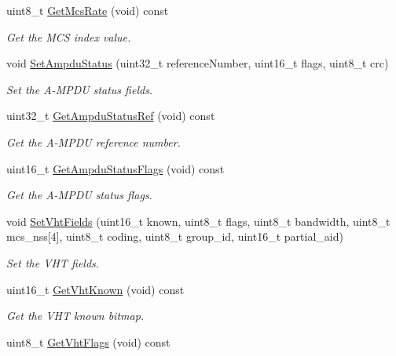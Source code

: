 \begin{DoxyCompactItemize}
uint8\+\_\+t \hyperlink{classns3_1_1RadiotapHeader_a76acbe2a92c1f1c29f6e6d86513d0b48}{Get\+Mcs\+Rate} (void) const 
\begin{DoxyCompactList}\small\item\em Get the M\+CS index value. \end{DoxyCompactList}\item 
void \hyperlink{classns3_1_1RadiotapHeader_a8fae7a24dbeba412fdb9b7fc79f74f41}{Set\+Ampdu\+Status} (uint32\+\_\+t reference\+Number, uint16\+\_\+t flags, uint8\+\_\+t crc)
\begin{DoxyCompactList}\small\item\em Set the A-\/\+M\+P\+DU status fields. \end{DoxyCompactList}\item 
uint32\+\_\+t \hyperlink{classns3_1_1RadiotapHeader_ad76416e8181f1df33505bef97e6bc9b5}{Get\+Ampdu\+Status\+Ref} (void) const 
\begin{DoxyCompactList}\small\item\em Get the A-\/\+M\+P\+DU reference number. \end{DoxyCompactList}\item 
uint16\+\_\+t \hyperlink{classns3_1_1RadiotapHeader_a250c74973add353a1d80c7167dbbbd75}{Get\+Ampdu\+Status\+Flags} (void) const 
\begin{DoxyCompactList}\small\item\em Get the A-\/\+M\+P\+DU status flags. \end{DoxyCompactList}\item 
void \hyperlink{classns3_1_1RadiotapHeader_a548ef08ad90c0b7c2e20a149d4e8942c}{Set\+Vht\+Fields} (uint16\+\_\+t known, uint8\+\_\+t flags, uint8\+\_\+t bandwidth, uint8\+\_\+t mcs\+\_\+nss\mbox{[}4\mbox{]}, uint8\+\_\+t coding, uint8\+\_\+t group\+\_\+id, uint16\+\_\+t partial\+\_\+aid)
\begin{DoxyCompactList}\small\item\em Set the V\+HT fields. \end{DoxyCompactList}\item 
uint16\+\_\+t \hyperlink{classns3_1_1RadiotapHeader_aad9b2ba6f3a4e27743e7a6e1b412a18c}{Get\+Vht\+Known} (void) const 
\begin{DoxyCompactList}\small\item\em Get the V\+HT known bitmap. \end{DoxyCompactList}\item 
uint8\+\_\+t \hyperlink{classns3_1_1RadiotapHeader_a13bec5051cccd94b6a1f07cc6d2c0c9e}{Get\+Vht\+Flags} (void) const 

\end{DoxyCompactItemize}
